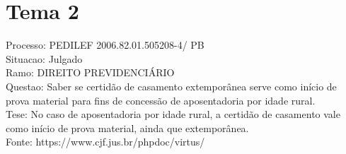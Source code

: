 \documentclass[12pt]{article}
\begin{document}
\section*{Tema 2}
Processo: PEDILEF 2006.82.01.505208-4/ PB\\
Situacao: Julgado\\
Ramo: DIREITO PREVIDENCIÁRIO\\
Questao: Saber se certidão de casamento extemporânea serve como início de prova material para fins de concessão de aposentadoria por idade rural.\\
Tese: No caso de aposentadoria por idade rural, a certidão de casamento vale como início de prova material, ainda que extemporânea.\\
Fonte: https://www.cjf.jus.br/phpdoc/virtus/
\end{document}
